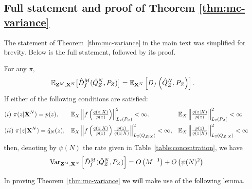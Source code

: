 \subsection{Full statement and proof of Theorem \ref{thm:mc-variance}}\label{appendix:full-statment-proof-mc}

The statement of Theorem~\ref{thm:mc-variance} in the main text was simplified for brevity. 
Below is the full statement, followed by its proof.



\begin{theorem}
For any $\pi$,
\begin{align*}
    \mathbb{E}_{\mathbf{Z}^M, \mathbf{X}^N} \bigl[\hat{D}^M_f( \hat{Q}_Z^N , P_Z)\bigr]
    &=\mathbb{E}_{\mathbf{X}^N} \left[ D_f\left( \hat{Q}^N_Z , P_Z \right)\right].
\end{align*}
If either of the following conditions are satisfied:
\begin{align*}
&(i) \ \pi(z|\mathbf{X}^N) = p(z),& 
&\textstyle{\mathbb{E}_X \left\| f\left( \frac{q(z|X)}{p(z)}\right) \right\|^2_{L_2(P_Z)}  < \infty,}&
&\textstyle{\mathbb{E}_X \left\| \frac{q(z|X)}{p(z)} \right\|^2_{L_2(P_Z)} < \infty} \\
&(ii) \  \pi(z | \mathbf{X}^N) = \hat{q}_N(z),&
&\textstyle{\mathbb{E}_X \left\| f\left( \frac{q(z|X)}{p(z)}\right)\frac{p(z)}{q(z|X)}\right\|^2_{L_2(Q_{Z|X})} < \infty,}&
&\textstyle{\mathbb{E}_X \left\| \frac{p(z)}{q(z|X)} \right\|^2_{L_2(Q_{Z|X})} < \infty}
\end{align*}
then, denoting by $\psi(N)$ the rate given in Table~\ref{table:concentration}, we have
\begin{align*}
    \text{Var}_{\mathbf{Z}^M, \mathbf{X}^N} \left[\hat{D}^M_f( \hat{Q}_Z^N , P_Z)  \right] = 
    O\left(M^{-1}\right) + O\left( \psi(N)^2 \right) 
\end{align*}
\end{theorem}

In proving Theorem~\ref{thm:mc-variance} we will make use of the following lemma.

